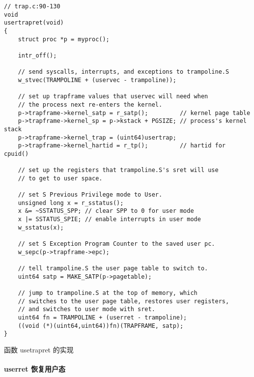 \begin{listing}[!htb]
	\begin{verbatim}
// trap.c:90-130
void
usertrapret(void)
{
    struct proc *p = myproc();

    intr_off();

    // send syscalls, interrupts, and exceptions to trampoline.S
    w_stvec(TRAMPOLINE + (uservec - trampoline));

    // set up trapframe values that uservec will need when
    // the process next re-enters the kernel.
    p->trapframe->kernel_satp = r_satp();         // kernel page table
    p->trapframe->kernel_sp = p->kstack + PGSIZE; // process's kernel stack
    p->trapframe->kernel_trap = (uint64)usertrap;
    p->trapframe->kernel_hartid = r_tp();         // hartid for cpuid()

    // set up the registers that trampoline.S's sret will use
    // to get to user space.

    // set S Previous Privilege mode to User.
    unsigned long x = r_sstatus();
    x &= ~SSTATUS_SPP; // clear SPP to 0 for user mode
    x |= SSTATUS_SPIE; // enable interrupts in user mode
    w_sstatus(x);

    // set S Exception Program Counter to the saved user pc.
    w_sepc(p->trapframe->epc);
    
    // tell trampoline.S the user page table to switch to.
    uint64 satp = MAKE_SATP(p->pagetable);

    // jump to trampoline.S at the top of memory, which 
    // switches to the user page table, restores user registers,
    // and switches to user mode with sret.
    uint64 fn = TRAMPOLINE + (userret - trampoline);
    ((void (*)(uint64,uint64))fn)(TRAPFRAME, satp);
}
	\end{verbatim}
	\caption{函数 usetrapret 的实现}\label{lst:usetrapret}
\end{listing}

\paragraph{userret 恢复用户态}

